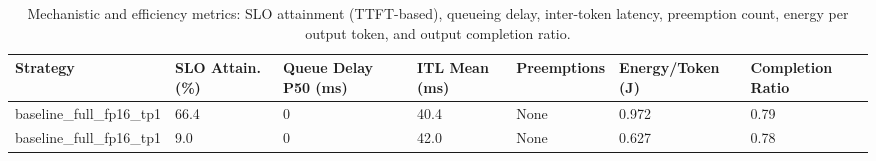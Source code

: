 \begin{table}
\caption{Mechanistic and efficiency metrics: SLO attainment (TTFT-based), queueing delay, inter-token latency, preemption count, energy per output token, and output completion ratio.}
\label{tab:efficiency}
\begin{tabular}{lllllll}
\toprule
Strategy & SLO Attain. (\%) & Queue Delay P50 (ms) & ITL Mean (ms) & Preemptions & Energy/Token (J) & Completion Ratio \\
\midrule
baseline\_full\_fp16\_tp1 & 66.4 & 0 & 40.4 & None & 0.972 & 0.79 \\
baseline\_full\_fp16\_tp1 & 9.0 & 0 & 42.0 & None & 0.627 & 0.78 \\
\bottomrule
\end{tabular}
\end{table}
